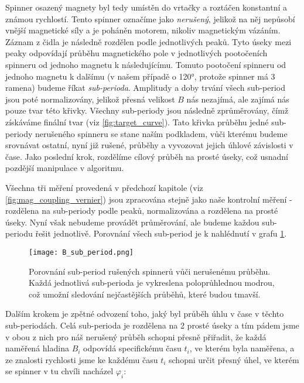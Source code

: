 Spinner osazený magnety byl tedy umístěn do vrtačky a roztáčen konstantní a známou rychlostí. Tento spinner označíme jako \textit{nerušený}, jelikož na něj nepůsobí vnější magnetické síly a je poháněn motorem, nikoliv magnetickým vázáním. Záznam z čidla je následně rozdělen podle jednotlivých peaků. Tyto úseky mezi peaky odpovídají průběhu magnetického pole v jednotlivých pootočeních spinneru od jednoho magnetu k následujícímu. Tomuto pootočení spinneru od jednoho magnetu k dalšímu (v našem případě o 120°, protože spinner má 3 ramena) budeme říkat \textit{sub-perioda}. Amplitudy a doby trvání všech sub-period jsou poté normalizovány, jelikož přesná velikost $B$ nás nezajímá, ale zajímá nás pouze tvar této křivky. Všechny sub-periody jsou následně zprůměrovány, čímž získáváme finální tvar (viz \autoref{fig:target_curve}). Tato křivka průběhu jedné sub-periody nerušeného spinneru se stane naším podkladem, vůči kterému budeme srovnávat ostatní, nyní již rušené, průběhy a vyvozovat jejich úhlové závislosti v čase. Jako poslední krok, rozdělíme cílový průběh na prosté úseky, což usnadní pozdější manipulace v algoritmu.

Všechna tři měření provedená v předchozí kapitole (viz \autoref{fig:mag_coupling_vernier}) jsou zpracována stejně jako naše kontrolní měření - rozdělena na sub-periody podle peaků, normalizována a rozdělena na prosté úseky. Nyní však nebudeme provádět průměrování, ale budeme každou sub-periodu řešit jednotlivě. Porovnání všech sub-period je k nahlédnutí v grafu \ref{fig:B_sub_periods}.

\clearpage

\begin{figure}[H]
    \texttt{[image: B\_sub\_period.png]}
    \centering
    \caption[Porovnání sub-period rušených spinnerů vůči nerušenému průběhu]{Porovnání sub-period rušených spinnerů vůči nerušenému průběhu. Každá jednotlivá sub-perioda je vykreslena poloprůhlednou modrou, což umožní sledování nejčastějších průběhů, které budou tmavší.}
    \label{fig:B_sub_periods}
\end{figure}

Dalším krokem je zpětné odvození toho, jaký byl průběh úhlu v čase v těchto sub-periodách. Celá sub-perioda je rozdělena na 2 prosté úseky a tím pádem jsme v obou z nich pro náš nerušený průběh schopni přesně přiřadit, že každá naměřená hladina $B_i$ odpovídá specifickému času $t_i$, ve kterém byla naměřena, a ze znalosti rychlosti jsme ke každému času $t_i$ schopni určit přesný úhel, ve kterém se spinner v tu chvíli nacházel $\varphi_i$:

